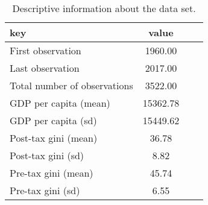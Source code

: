 \begin{table}[t]

\caption{\label{tab:tab:desc}Descriptive information about the data set.}
\centering
\begin{tabular}{lclc}
\toprule
key & value\\
\midrule
First observation & 1960.00\\
Last observation & 2017.00\\
Total number of observations & 3522.00\\
GDP per capita (mean) & 15362.78\\
GDP per capita (sd) & 15449.62\\
\addlinespace
Post-tax gini (mean) & 36.78\\
Post-tax gini (sd) & 8.82\\
Pre-tax gini (mean) & 45.74\\
Pre-tax gini (sd) & 6.55\\
\bottomrule
\end{tabular}
\end{table}
